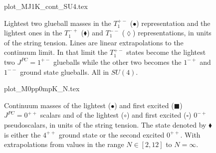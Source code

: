 \documentclass[12pt]{article}
\begin{document}
\begin{figure}[htb]
\begin	{center}
\leavevmode
	{plot_MJ1K_cont_SU4.tex}
\end	{center}
\caption{Lightest two glueball masses in the $T_1^{+-}$ ($\bullet$) representation
  and the lightest ones in the $T_1^{-+}$ ($\blacklozenge$)
  and $T_1^{--}$ ($\lozenge$) representations, in units of the string tension. Lines are linear
  extrapolations to the continuum limit. In that limit the  $T_1^{+-}$ states become the
  lightest two $J^{PC}=1^{+-}$ glueballs while the other two becomes the
  $1^{-+}$ and $1^{--}$ ground state glueballs.  All in $SU(4)$.}
\label{fig_MJ1K_cont_SU4}
\end{figure}





\begin{figure}[htb]
\begin	{center}
\leavevmode
	{plot_M0pp0mpK_N.tex}
\end	{center}
\caption{Continuum masses of the lightest ($\bullet$) and first excited ($\blacksquare$)
  $J^{PC}=0^{++}$ scalars and of the lightest ($\circ$) and first excited ($\square$)
  $0^{-+}$ pseudoscalars, in units of the string tension. The state denoted by
  $\blacklozenge$ is either the $4^{++}$ ground state or the second excited $0^{++}$.
  With extrapolations from values in the range $N\in[2,12]$ to $N=\infty$.}
\label{fig_M0pp0mpK_N}
\end{figure}
\end{document}
